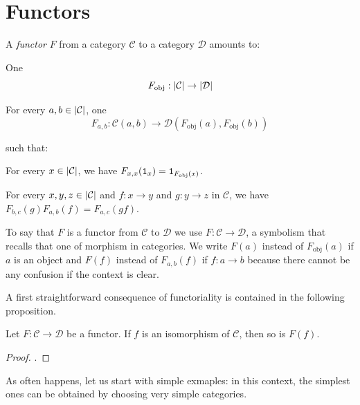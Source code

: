 \section{Functors}

\begin{definition}[Functors]\label{definition:functors}
  A {\em functor} \(F\) from a category \(\mathcal{C}\) to a category
  \(\mathcal{D}\) amounts to:
  \begin{tcbitem}
  \item One 
    \[
      F_{\text{obj}} : \left\lvert\mathcal{C}\right\rvert \to \left\lvert\mathcal{D}\right\rvert
    \]
  \item For every \(a, b \in \left\lvert\mathcal{C}\right\rvert\), one 
    \[
      F_{a, b} : \mathcal{C}(a, b) \to \mathcal{D}(F_{\text{obj}}(a),
      F_{\text{obj}}(b))
    \]
  \end{tcbitem}
  such that:
  \begin{tcbenum}
  \item For every \(x \in \left\lvert\mathcal{C}\right\rvert\), we have
    \(F_{x, x}(\mathtt 1_x) = \mathtt 1_{F_{\text{obj}}(x)}\).
  \item For every \(x, y, z \in \left\lvert\mathcal{C}\right\rvert\) and \(f : x \to y\) and
    \(g : y \to z\) in \(\mathcal{C}\), we have
    \(F_{b, c}(g) F_{a, b}(f) = F_{a, c}(gf)\).
  \end{tcbenum}
  To say that \(F\) is a functor from \(\mathcal{C}\) to \(\mathcal{D}\) we use
  \(F : \mathcal{C} \to \mathcal{D}\), a symbolism that recalls that one of morphism
  in categories. We write \(F(a)\) instead of \(F_{\text{obj}}(a)\) if
  \(a\) is an object and \(F(f)\) instead of \(F_{a, b}(f)\) if
  \(f : a \to b\) because there cannot be any confusion if the context is
  clear.
\end{definition}

A first straightforward consequence of functoriality is contained in the
following proposition.

\begin{proposition}
  Let \(F : \mathcal{C} \to \mathcal{D}\) be a functor. If \(f\) is an isomorphism
  of \(\mathcal{C}\), then so is \(F(f)\).
\end{proposition}

\begin{proof}
  .
\end{proof}

As often happens, let us start with simple exmaples: in this context,
the simplest ones can be obtained by choosing very simple categories.

